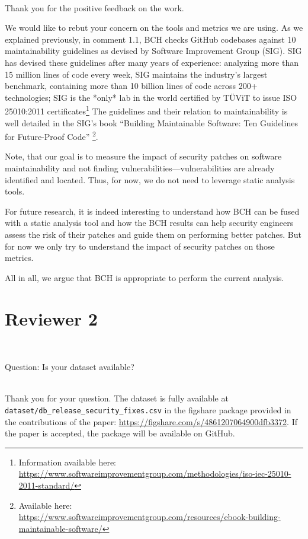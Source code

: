 \documentclass[11pt,fleqn]{article}
\newcommand{\eline}{\vspace*{.75\baselineskip}}
\newcommand{\Referee}[1]{\eline \noindent {\bf Reviewer comment #1:} \\}
\newcommand{\Us}{\eline \noindent {\bf Response:}\\}
\newcommand{\newreviewer}[1]{\section*{Reviewer #1}\vspace*{-1.05\baselineskip}}
\newenvironment{revcomment}[1][]
{\Referee{#1}\begin{rcomment}}
{\end{rcomment}}
\begin{document}
\Us Thank you for the positive feedback on the work. 

We would like to rebut your concern on the tools and 
metrics we are using. As we explained previously, in comment 1.1, 
BCH checks GitHub codebases against 10 maintainability guidelines 
as devised by Software Improvement Group (SIG). SIG has devised 
these guidelines after many years of experience: analyzing more 
than 15 million lines of code every week, SIG maintains the industry’s largest 
benchmark, containing more than 10 billion lines of code across 200+ technologies; SIG 
is the *only* lab in the world certified by TÜViT to issue ISO 25010:2011 
certificates\footnote{Information available here: 
\url{https://www.softwareimprovementgroup.com/methodologies/iso-iec-25010-2011-standard/}}
The guidelines and their relation to maintainability is well 
detailed in the SIG's book ``Building Maintainable 
Software: Ten Guidelines for Future-Proof Code''
\footnote{Available here: \url{https://www.softwareimprovementgroup.com/resources/ebook-building-maintainable-software/}}.

Note, that our goal is to measure the impact of security patches on software 
maintainability and not finding vulnerabilities---vulnerabilities
are already identified and located. Thus, for now, 
we do not need to leverage static analysis tools. 

For future research, it is indeed interesting to 
understand how BCH can be fused with a static analysis tool 
and how the BCH results can help 
security engineers assess the risk of their patches and guide 
them on performing better patches. But for now we only try
to understand the impact of security patches on those metrics.

All in all, we argue that BCH is appropriate 
to perform the current analysis.

\pagebreak

\newreviewer{2}

\begin{revcomment}[2.1]

    Question:  Is your dataset available?

\end{revcomment}

\Us Thank you for your question. The dataset is fully available at 
\texttt{dataset/db\_release\_security\_fixes.csv} in the figshare package
provided in the contributions of the paper: 
\url{https://figshare.com/s/4861207064900dfb3372}. If the paper is 
accepted, the package will be available on GitHub.
\end{document}
